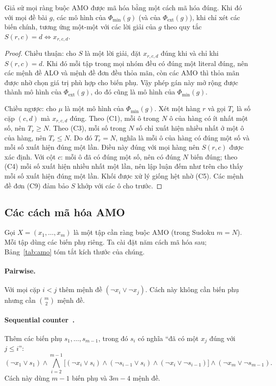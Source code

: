 \documentclass[a4paper,fleqn]{cas-sc}
\begin{document}
\begin{proposition}\label{prop:sudoku}
Giả sử mọi ràng buộc AMO được mã hóa bằng một cách mã hóa đúng. Khi đó với mọi đề bài $g$, các mô hình của $\Phi_{\min}(g)$ (và của $\Phi_{\mathrm{ext}}(g)$), khi chỉ xét các biến chính, tương ứng một-một với các lời giải của $g$ theo quy tắc $S(r,c)=d\iff x_{r,c,d}$.
\end{proposition}

\begin{proof}
Chiều thuận: cho $S$ là một lời giải, đặt $x_{r,c,d}$ đúng khi và chỉ khi $S(r,c)=d$. Khi đó mỗi tập trong mọi nhóm đều có đúng một literal đúng, nên các mệnh đề ALO và mệnh đề đơn đều thỏa mãn, còn các AMO thì thỏa mãn được nhờ chọn giá trị phù hợp cho biến phụ. Vậy phép gán này mở rộng được thành mô hình của $\Phi_{\mathrm{ext}}(g)$, do đó cũng là mô hình của $\Phi_{\min}(g)$.

Chiều ngược: cho $\mu$ là một mô hình của $\Phi_{\min}(g)$. Xét một hàng $r$ và gọi $T_r$ là số cặp $(c,d)$ mà $x_{r,c,d}$ đúng. Theo (C1), mỗi ô trong $N$ ô của hàng có ít nhất một số, nên $T_r\ge N$. Theo (C3), mỗi số trong $N$ số chỉ xuất hiện nhiều nhất ở một ô của hàng, nên $T_r\le N$. Do đó $T_r=N$, nghĩa là mỗi ô của hàng có đúng một số và mỗi số xuất hiện đúng một lần. Điều này đúng với mọi hàng nên $S(r,c)$ được xác định. Với cột $c$: mỗi ô đã có đúng một số, nên có đúng $N$ biến đúng; theo (C4) mỗi số xuất hiện nhiều nhất một lần, nên lập luận đếm như trên cho thấy mỗi số xuất hiện đúng một lần. Khối được xử lý giống hệt nhờ (C5). Các mệnh đề đơn (C9) đảm bảo $S$ khớp với các ô cho trước.
\end{proof}

\subsection{Các cách mã hóa AMO}\label{sec:amo}

Gọi $X=(x_1,\dots,x_m)$ là một tập cần ràng buộc AMO (trong Sudoku $m=N$). Mỗi tập dùng các biến phụ riêng. Ta cài đặt năm cách mã hóa sau; Bảng~\ref{tab:amo} tóm tắt kích thước của chúng.

\paragraph{Pairwise.} Với mọi cặp $i<j$ thêm mệnh đề $(\neg x_i\vee\neg x_j)$. Cách này không cần biến phụ nhưng cần $\binom{m}{2}$ mệnh đề.

\paragraph{Sequential counter~\citep{sinz2005}.} Thêm các biến phụ $s_1,\dots,s_{m-1}$, trong đó $s_i$ có nghĩa ``đã có một $x_j$ đúng với $j\le i$'':
\begin{equation}
(\neg x_1\vee s_1)\wedge\bigwedge_{i=2}^{m-1}\big[(\neg x_i\vee s_i)\wedge(\neg s_{i-1}\vee s_i)\wedge(\neg x_i\vee\neg s_{i-1})\big]\wedge(\neg x_m\vee\neg s_{m-1}). \label{eq:seq}
\end{equation}
Cách này dùng $m-1$ biến phụ và $3m-4$ mệnh đề.
\end{document}
